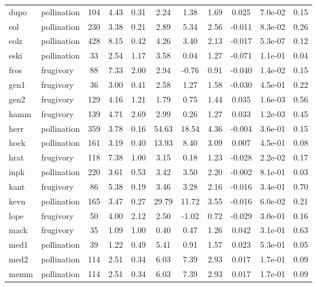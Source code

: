 \begin{table}[]
{\begin{tabular}{@{}llccccccccc@{}}
dupo \cite{dupo} & pollination & 104 & 4.43 & 0.31 & 2.24 & 1.38 & 1.69 & 0.025 & 7.0e-02 & 0.15 \\
eol  \cite{eol}  & pollination & 230 & 3.38 & 0.21 & 2.89 & 5.34 & 2.56 & -0.011 & 8.3e-02 & 0.26 \\
eolz \cite{eolz} & pollination & 428 & 8.15 & 0.42 & 4.26 & 3.40 & 2.13 & -0.017 & 5.3e-07 & 0.12 \\
eski \cite{eski} & pollination & 33 & 2.54 & 1.17 & 3.58 & 0.04 & 1.27 & -0.071 & 1.1e-01 & 0.04 \\
fros \cite{fros} & frugivory & 88 & 7.33 & 2.00 & 2.94 & -0.76 & 0.91 & -0.040 & 1.4e-02 & 0.15 \\
gen1 \cite{gen1} & frugivory & 36 & 3.00 & 0.41 & 2.58 & 1.27 & 1.58 & -0.030 & 4.5e-01 & 0.22 \\
gen2 \cite{gen1} & frugivory & 129 & 4.16 & 1.21 & 1.79 & 0.75 & 1.44 & 0.035 & 1.6e-03 & 0.56 \\
hamm \cite{hamm} & frugivory & 139 & 4.71 & 2.69 & 2.99 & 0.26 & 1.27 & 0.033 & 1.2e-03 & 0.45 \\
herr \cite{herr} & pollination & 359 & 3.78 & 0.16 & 54.63 & 18.54 & 4.36 & -0.004 & 3.6e-01 & 0.15 \\
hock \cite{hock} & pollination & 161 & 3.19 & 0.40 & 13.93 & 8.40 & 3.09 & 0.007 & 4.5e-01 & 0.08 \\
hrat \cite{hrat} & frugivory & 118 & 7.38 & 1.00 & 3.15 & 0.18 & 1.23 & -0.028 & 2.2e-02 & 0.17 \\
inpk \cite{inpk} & pollination & 220 & 3.61 & 0.53 & 3.42 & 3.50 & 2.20 & -0.002 & 8.1e-01 & 0.03 \\
kant \cite{kant} & frugivory & 86 & 5.38 & 0.19 & 3.46 & 3.28 & 2.16 & -0.016 & 3.4e-01 & 0.70 \\
kevn \cite{kevn} & pollination & 165 & 3.47 & 0.27 & 29.79 & 11.72 & 3.55 & -0.016 & 6.0e-02 & 0.21 \\
lope \cite{lope} & frugivory & 50 & 4.00 & 2.12 & 2.50 & -1.02 & 0.72 & -0.029 & 3.0e-01 & 0.16 \\
mack \cite{mack} & frugivory & 35 & 1.09 & 1.00 & 0.40 & 0.47 & 1.26 & 0.042 & 3.1e-01 & 0.63 \\
med1 \cite{med1} & pollination & 39 & 1.22 & 0.49 & 5.41 & 0.91 & 1.57 & 0.023 & 5.3e-01 & 0.05 \\
med2 \cite{med1} & pollination & 114 & 2.51 & 0.34 & 6.03 & 7.39 & 2.93 & 0.017 & 1.7e-01 & 0.09 \\
memm \cite{memm} & pollination & 114 & 2.51 & 0.34 & 6.03 & 7.39 & 2.93 & 0.017 & 1.7e-01 & 0.09 \\

\end{tabular}}
\end{table}
